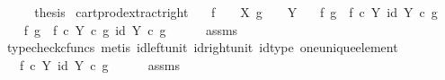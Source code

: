 \begin{isabellebody}
\ \ \isamarkupfalse%
\ \isamarkupfalse%
\ {\isacharquery}{\kern0pt}thesis\isacommand{{\isachardot}{\kern0pt}}\isamarkupfalse%
\isanewline
{}\isamarkupfalse%
%
\endisatagproof
{\isafoldproof}%
%
\isadelimproof
\isanewline
%
\endisadelimproof
\isanewline
{}\isamarkupfalse%
\ cart{\isacharunderscore}{\kern0pt}prod{\isacharunderscore}{\kern0pt}extract{\isacharunderscore}{\kern0pt}right{\isacharcolon}{\kern0pt}\isanewline
\ \ \ {\isachardoublequoteopen}f\ {\isacharcolon}{\kern0pt}\ {\isasymone}\ {\isasymrightarrow}\ X{\isachardoublequoteclose}\ {\isachardoublequoteopen}g\ {\isacharcolon}{\kern0pt}\ {\isasymone}\ {\isasymrightarrow}\ Y{\isachardoublequoteclose}\isanewline
\ \ \ {\isachardoublequoteopen}{\isasymlangle}f{\isacharcomma}{\kern0pt}\ g{\isasymrangle}\ {\isacharequal}{\kern0pt}\ {\isasymlangle}f\ {\isasymcirc}\isactrlsub c\ {\isasymbeta}\isactrlbsub Y\isactrlesub {\isacharcomma}{\kern0pt}\ id\ Y{\isasymrangle}\ {\isasymcirc}\isactrlsub c\ g{\isachardoublequoteclose}\isanewline
%
\isadelimproof
%
\endisadelimproof
%
\isatagproof
{}\isamarkupfalse%
\ {\isacharminus}{\kern0pt}\isanewline
\ \ \isamarkupfalse%
\ {\isachardoublequoteopen}{\isasymlangle}f{\isacharcomma}{\kern0pt}\ g{\isasymrangle}\ {\isacharequal}{\kern0pt}\ {\isasymlangle}f\ {\isasymcirc}\isactrlsub c\ {\isasymbeta}\isactrlbsub Y\isactrlesub \ {\isasymcirc}\isactrlsub c\ g{\isacharcomma}{\kern0pt}\ id\ Y\ {\isasymcirc}\isactrlsub c\ g{\isasymrangle}{\isachardoublequoteclose}\isanewline
\ \ \ \ \isamarkupfalse%
\ assms\ \isamarkupfalse%
\ {\isacharparenleft}{\kern0pt}typecheck{\isacharunderscore}{\kern0pt}cfuncs{\isacharcomma}{\kern0pt}\ metis\ id{\isacharunderscore}{\kern0pt}left{\isacharunderscore}{\kern0pt}unit{}\ id{\isacharunderscore}{\kern0pt}right{\isacharunderscore}{\kern0pt}unit{}\ id{\isacharunderscore}{\kern0pt}type\ one{\isacharunderscore}{\kern0pt}unique{\isacharunderscore}{\kern0pt}element{\isacharparenright}{\kern0pt}\isanewline
\ \ \isamarkupfalse%
\ \isamarkupfalse%
\ {\isachardoublequoteopen}{\isachardot}{\kern0pt}{\isachardot}{\kern0pt}{\isachardot}{\kern0pt}\ {\isacharequal}{\kern0pt}\ {\isasymlangle}f\ {\isasymcirc}\isactrlsub c\ {\isasymbeta}\isactrlbsub Y\isactrlesub {\isacharcomma}{\kern0pt}\ id\ Y{\isasymrangle}\ {\isasymcirc}\isactrlsub c\ g{\isachardoublequoteclose}\isanewline
\ \ \ \ \isamarkupfalse%
\ assms\ \isamarkupfalse%

\end{isabellebody}

